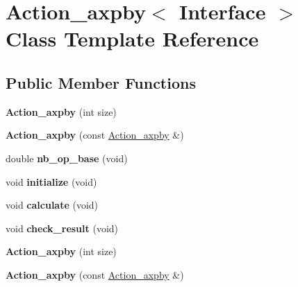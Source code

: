 \hypertarget{class_action__axpby}{}\section{Action\+\_\+axpby$<$ Interface $>$ Class Template Reference}
\label{class_action__axpby}
\subsection*{Public Member Functions}
\begin{DoxyCompactItemize}
\item 
\mbox{\label{class_action__axpby_a6a50dc9c3f07cc575a340a93c1772034}} 
{\bfseries Action\+\_\+axpby} (int size)
\item 
\mbox{\label{class_action__axpby_a54fd0ef42e28ea00c42c2b77150d0683}} 
{\bfseries Action\+\_\+axpby} (const \hyperlink{class_action__axpby}{Action\+\_\+axpby} \&)
\item 
\mbox{\label{class_action__axpby_a344a41231b1cc0cd5aaedfb01b44042e}} 
double {\bfseries nb\+\_\+op\+\_\+base} (void)
\item 
\mbox{\label{class_action__axpby_abbb5ab370440a34f86034b9baa721796}} 
void {\bfseries initialize} (void)
\item 
\mbox{\label{class_action__axpby_afb3186f69d3fee352beb40d0b300b831}} 
void {\bfseries calculate} (void)
\item 
\mbox{\label{class_action__axpby_ae30b2fa4dffb28b723488ddd32a5532b}} 
void {\bfseries check\+\_\+result} (void)
\item 
\mbox{\label{class_action__axpby_a6a50dc9c3f07cc575a340a93c1772034}} 
{\bfseries Action\+\_\+axpby} (int size)
\item 
\mbox{\label{class_action__axpby_a54fd0ef42e28ea00c42c2b77150d0683}} 
{\bfseries Action\+\_\+axpby} (const \hyperlink{class_action__axpby}{Action\+\_\+axpby} \&)
\item 
\mbox{\label{class_action__axpby_a344a41231b1cc0cd5aaedfb01b44042e}} 

\end{DoxyCompactItemize}
